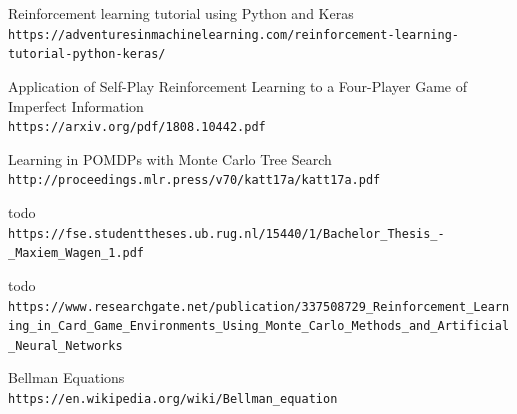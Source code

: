 \documentclass[11pt]{article}
\begin{document}
\begin{thebibliography}{9}
Reinforcement learning tutorial using Python and Keras 
\\\texttt{https://adventuresinmachinelearning.com/reinforcement-learning-tutorial-python-keras/}

Application of Self-Play Reinforcement Learning to a Four-Player Game of Imperfect Information
\\\texttt{https://arxiv.org/pdf/1808.10442.pdf}

Learning in POMDPs with Monte Carlo Tree Search
\\\texttt{http://proceedings.mlr.press/v70/katt17a/katt17a.pdf}

todo
\\\texttt{https://fse.studenttheses.ub.rug.nl/15440/1/Bachelor\_Thesis\_-\_Maxiem\_Wagen\_1.pdf}

todo
\\\texttt{https://www.researchgate.net/publication/337508729\_Reinforcement\_Learning\_in\_Card\_Game\_Environments\_Using\_Monte\_Carlo\_Methods\_and\_Artificial\_Neural\_Networks}

Bellman Equations
\\\texttt{https://en.wikipedia.org/wiki/Bellman\_equation}
\end{thebibliography}
\end{document}
